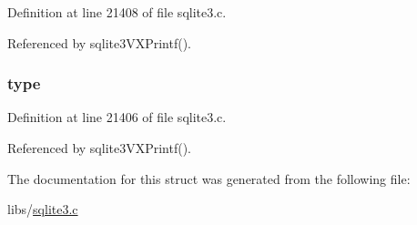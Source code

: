 Definition at line 21408 of file sqlite3.\+c.



Referenced by sqlite3\+V\+X\+Printf().

\hypertarget{structet__info_a13133dd686ddd2d9d5e85aece7d29e3c}{}
\subsubsection[{type}]{ type}\label{structet__info_a13133dd686ddd2d9d5e85aece7d29e3c}


Definition at line 21406 of file sqlite3.\+c.



Referenced by sqlite3\+V\+X\+Printf().



The documentation for this struct was generated from the following file\+:\begin{DoxyCompactItemize}
\item 
libs/\hyperlink{sqlite3_8c}{sqlite3.\+c}\end{DoxyCompactItemize}
